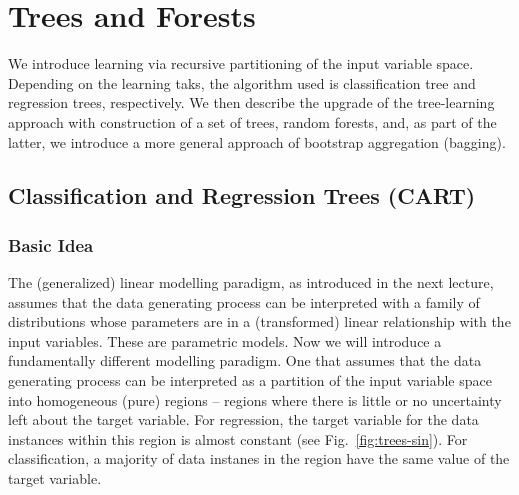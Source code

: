 \chapter{Trees and Forests}

\begin{summary}
We introduce learning via recursive partitioning of the input variable space. Depending on the learning taks, the algorithm used is classification tree and regression trees, respectively. We then describe the upgrade of the tree-learning approach with construction of a set of trees, random forests, and, as part of the latter, we introduce a more general approach of bootstrap aggregation (bagging).
\end{summary}

\section{Classification and Regression Trees (CART)}


\subsection*{Basic Idea}

The (generalized) linear modelling paradigm, as introduced in the next lecture, assumes that the data generating process can be interpreted with a family of distributions whose parameters are in a (transformed) linear relationship with the input variables. These are parametric models. Now we will introduce a fundamentally different modelling paradigm. One that assumes that the data generating process can be interpreted as a partition of the input variable space into homogeneous (pure) regions -- regions where there is little or no uncertainty left about the target variable. For regression, the target variable for the data instances within this region is almost constant (see Fig.~\ref{fig:trees-sin}). For classification, a majority of data instanes in the region have the same value of the target variable.

